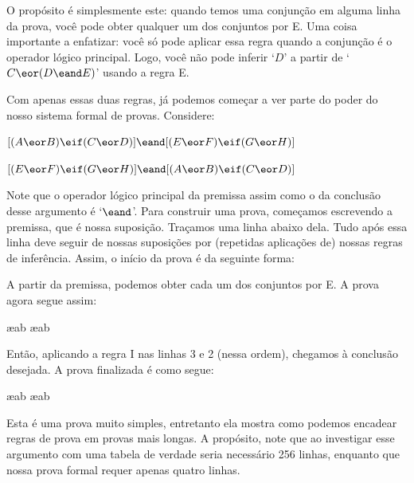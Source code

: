 O propósito é simplesmente este: quando temos uma conjunção em alguma linha da prova, você pode obter qualquer um dos conjuntos  por {\eand}E.  Uma coisa importante a enfatizar:  você só pode aplicar essa regra quando a conjunção é o operador lógico principal. Logo, você não pode inferir `$D$' a partir de `$C \eor (D \eand E)$' usando a regra {\eand}E.

Com apenas essas duas regras, já podemos começar a ver parte do poder do nosso sistema formal de provas.  Considere: 
\begin{earg}
\item[] $[(A\eor B)\eif(C\eor D)] \eand [(E \eor F) \eif (G\eor H)]$
\item[\therefore] $[(E \eor F) \eif (G\eor H)] \eand [(A\eor B)\eif(C\eor D)]$
\end{earg}
Note que o operador lógico principal da premissa assim como o da conclusão  desse argumento é `$\eand$'.  Para construir uma prova, começamos escrevendo a premissa, que é nossa suposição. Traçamos uma linha abaixo dela. Tudo após essa linha deve seguir de nossas suposições por  (repetidas aplicações de) nossas regras de inferência. Assim, o início da prova é da seguinte forma: 
\begin{fitchproof}
\end{fitchproof}
A partir da premissa, podemos obter cada um dos conjuntos por  {\eand}E. A prova agora segue assim: 
\begin{fitchproof}
	 \ae{ab}
	 \ae{ab}
\end{fitchproof}
Então, aplicando a regra {\eand}I  nas linhas 3 e 2 (nessa ordem), chegamos à conclusão desejada. A  prova finalizada é como segue:


\begin{fitchproof}
	 \ae{ab}
	 \ae{ab}
	 
\end{fitchproof}

 Esta é uma prova muito simples, entretanto ela mostra como podemos encadear regras de  prova em provas mais longas.  A propósito, note que ao investigar esse argumento com uma tabela de verdade seria necessário 256 linhas, enquanto que nossa prova formal requer apenas quatro linhas.

